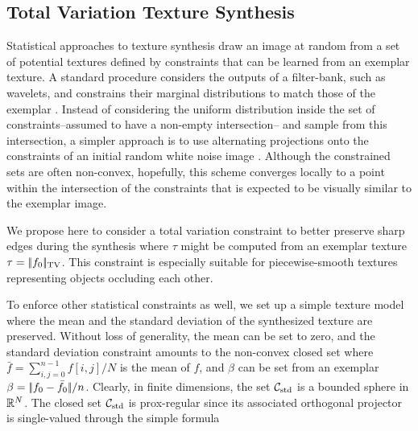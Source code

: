 \documentclass[11pt,nofonttune,a4paper]{IEEEtran}
\DeclareMathOperator{\Proj}{Proj}
\begin{document}
\subsection{Total Variation Texture Synthesis}
\label{subsec-texture-synth}

Statistical approaches to texture synthesis draw an image at random from a set of potential textures defined by constraints that can be learned from an exemplar texture. A standard procedure considers the outputs of a filter-bank, such as wavelets, and constrains their marginal distributions to match those of the exemplar \cite{heeger-pyramid-texture,zhu-frame}. Instead of considering the uniform distribution inside the set of constraints--assumed to have a non-empty intersection-- and sample from this intersection, a simpler approach is to use alternating projections onto the constraints of an initial random white noise image \cite{portilla-parametric-model}. Although the constrained sets are often non-convex, hopefully, this scheme converges locally to a point within the intersection of the constraints that is expected to be visually similar to the exemplar image.

We propose here to consider a total variation constraint to better preserve sharp edges during the synthesis
where $\tau$ might be computed from an exemplar texture $\tau = |\!| f_0 |\!|_{\text{TV}}$.
This constraint is especially suitable for piecewise-smooth textures representing objects occluding each other.

To enforce other statistical constraints as well, we set up a simple texture model where the mean and the standard deviation of the synthesized texture are preserved. Without loss of generality, the mean can be set to zero, and the standard deviation constraint amounts to the non-convex closed set
where $\bar{f} = \sum_{i,j=0}^{n-1} f[i,j]/N$ is the mean of $f$, and $\beta$ can be set from an exemplar $\beta = |\!| f_0 - \bar{f_0} |\!|/n$. Clearly, in finite dimensions, the set $\mathcal{C}_{\text{std}}$ is a bounded sphere in $\mathbb{R}^N$. The closed set $\mathcal{C}_{\text{std}}$ is prox-regular since its associated orthogonal projector is single-valued through the simple formula
\eql{\label{eq-histo-matching}
      \Proj_{\Cc_\text{std}}(f) = n\beta \left(f - \bar{f}\right)/\norm{f - \bar{f}} ~.
}
\end{document}
